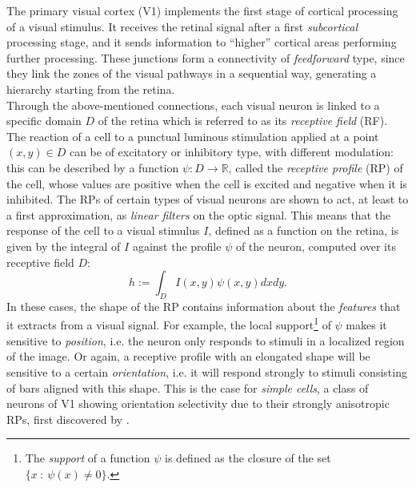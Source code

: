 \documentclass[11pt,oneside,reqno]{amsart}
\begin{document}
 The primary visual cortex (V1) implements the first stage of cortical processing of a visual stimulus. It receives the retinal signal after a first \emph{subcortical} processing stage, and it sends information to ``higher'' cortical areas performing further processing. These junctions form a connectivity of \emph{feedforward} type, since they link the zones of the visual pathways in a sequential way, generating a hierarchy starting from the retina.\\
 Through the above-mentioned connections, each visual neuron is linked to a specific domain $D$ of the retina which is referred to as its \emph{receptive field} (RF). The reaction of a cell to a punctual luminous stimulation applied at a point $(x,y) \in D$ can be of excitatory or inhibitory type, with different modulation: this can be described by a function $\psi : D \rightarrow \mathbb{R}$, called the \emph{receptive profile} (RP) of the cell, whose values are positive when the cell is excited and negative when it is inhibited. The RPs of certain types of visual neurons are shown to act, at least to a first approximation, as \emph{linear filters} on the optic signal. This means that the response of the cell to a visual stimulus $I$, defined as a function on the retina, is given by the integral of $I$ against the profile $\psi$ of the neuron, computed over its receptive field $D$:
\begin{equation}\label{linfilt}h := \int_D I(x,y)\psi(x,y)dxdy.\end{equation}
 In these cases, the shape of the RP contains information about the \emph{features} that it extracts from a visual signal. For example, the local support\footnote{The \emph{support} of a function $\psi$ is defined as the closure of the set $\{x \: : \: \psi(x)\neq 0\}$.} of $\psi$ makes it sensitive to \emph{position}, i.e. the neuron only responds to stimuli in a localized region of the image. Or again, a receptive profile with an elongated shape will be sensitive to a certain \emph{orientation}, i.e. it will respond strongly to stimuli consisting of bars aligned with this shape. This is the case for \emph{simple cells}, a class of neurons of V1 showing orientation selectivity due to their strongly anisotropic RPs, first discovered by \citet{HW}.\\
 
\end{document}

